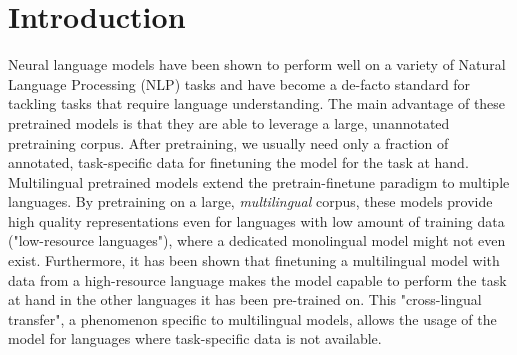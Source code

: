 
\chapter{Introduction}
\label{chap:introduction}





Neural language models have been shown to perform well on a variety of Natural Language Processing (NLP) tasks and have become a de-facto standard for tackling tasks that require language understanding. The main advantage of these pretrained models is that they are able to leverage a large, unannotated pretraining corpus. After pretraining, we usually need only a fraction of annotated, task-specific data for finetuning the model for the task at hand. \cite{devlin_bert_2019,radford_improving_nodate} Multilingual pretrained models extend the pretrain-finetune paradigm to multiple languages. By pretraining on a large, \textit{multilingual} corpus, these models provide high quality representations even for languages with low amount of training data ("low-resource languages"), where a dedicated monolingual model might not even exist. Furthermore, it has been shown that finetuning a multilingual model with data from a high-resource language makes the model capable to perform the task at hand in the other languages it has been pre-trained on. This "cross-lingual transfer", a phenomenon specific to multilingual models, allows the usage of the model for languages where task-specific data is not available. \cite{k_cross-lingual_2022,conneau_unsupervised_2020-1}

